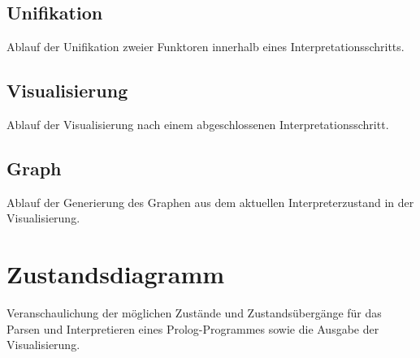 \documentclass[parskip=full,11pt,twoside]{scrartcl}
\begin{document}
\subsection{Unifikation}
Ablauf der Unifikation zweier Funktoren innerhalb eines Interpretationsschritts.
\newpage
\newpage
\subsection{Visualisierung}
Ablauf der Visualisierung nach einem abgeschlossenen Interpretationsschritt. 
\newpage
\newpage
\subsection{Graph}
Ablauf der Generierung des Graphen aus dem aktuellen Interpreterzustand in der Visualisierung.
\newpage

\section{Zustandsdiagramm}
Veranschaulichung der möglichen Zustände und Zustandsübergänge für das Parsen und Interpretieren eines Prolog-Programmes sowie die Ausgabe der Visualisierung.
\vspace*{2cm}
\end{document}

